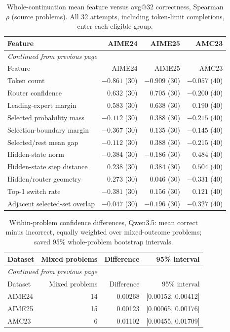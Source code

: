 \begingroup\scriptsize\setlength{\tabcolsep}{4pt}
\begin{longtable}{@{}lrrr@{}}
\caption{Whole-continuation mean feature versus avg@32 correctness, Spearman $\rho$ (source problems). All 32 attempts, including token-limit completions, enter each eligible group.}\label{tab:qwen-repeated}\\
\toprule
Feature & AIME24 & AIME25 & AMC23 \\
\midrule\endfirsthead
\multicolumn{4}{l}{\textit{Continued from previous page}}\\
\toprule
Feature & AIME24 & AIME25 & AMC23 \\
\midrule\endhead
\bottomrule\endfoot
Token count & $-0.861$ (30) & $-0.909$ (30) & $-0.057$ (40) \\
Router confidence & $0.632$ (30) & $0.705$ (30) & $-0.200$ (40) \\
Leading-expert margin & $0.583$ (30) & $0.638$ (30) & $0.190$ (40) \\
Selected probability mass & $-0.112$ (30) & $0.388$ (30) & $-0.215$ (40) \\
Selection-boundary margin & $-0.367$ (30) & $0.135$ (30) & $-0.145$ (40) \\
Selected/rest mean gap & $-0.112$ (30) & $0.388$ (30) & $-0.215$ (40) \\
Hidden-state norm & $-0.384$ (30) & $-0.186$ (30) & $0.484$ (40) \\
Hidden-state step distance & $0.238$ (30) & $0.384$ (30) & $0.504$ (40) \\
Hidden/router geometry & $0.273$ (30) & $0.046$ (30) & $-0.331$ (40) \\
Top-1 switch rate & $-0.381$ (30) & $0.156$ (30) & $0.121$ (40) \\
Adjacent selected-set overlap & $-0.047$ (30) & $-0.196$ (30) & $-0.327$ (40) \\
\end{longtable}\endgroup
\begingroup\scriptsize\setlength{\tabcolsep}{4pt}
\begin{longtable}{@{}lrrr@{}}
\caption{Within-problem confidence differences, Qwen3.5: mean correct minus incorrect, equally weighted over mixed-outcome problems; saved 95\% whole-problem bootstrap intervals.}\label{tab:qwen-within}\\
\toprule
Dataset & Mixed problems & Difference & 95\% interval \\
\midrule\endfirsthead
\multicolumn{4}{l}{\textit{Continued from previous page}}\\
\toprule
Dataset & Mixed problems & Difference & 95\% interval \\
\midrule\endhead
\bottomrule\endfoot
AIME24 & 14 & 0.00268 & [0.00152, 0.00412] \\
AIME25 & 15 & 0.00123 & [0.00065, 0.00176] \\
AMC23 & 6 & 0.01102 & [0.00455, 0.01709] \\
\end{longtable}\endgroup
